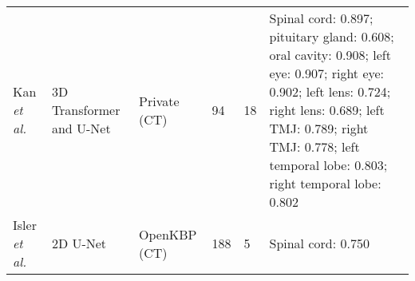 \documentclass[lettersize,journal]{IEEEtran}
\begin{document}
{\begin{table*}[ht!]
{\begin{tabular}{@{}lllllm{}@{}}
Kan {\it{et al.}} \cite{51}         & 3D Transformer and U-Net  & Private (CT)              & 94                        & 18                          & Spinal cord: 0.897; pituitary gland: 0.608; oral cavity: 0.908; left eye: 0.907; right eye: 0.902; left lens: 0.724; right lens: 0.689; left TMJ: 0.789; right TMJ: 0.778; left temporal lobe: 0.803; right temporal lobe: 0.802                                                                                                                                                                                                                                                                                                          \\
Isler {\it{et al.}} \cite{54}       & 2D U-Net                  & OpenKBP (CT) \cite{36}     & 188                       & 5                           & Spinal cord: 0.750                                                                                                                                                                                                                                                                                                                                                                                                                                                                                                                        \\ \bottomrule
\end{tabular}%
}
\end{table*}

}
\end{document}

